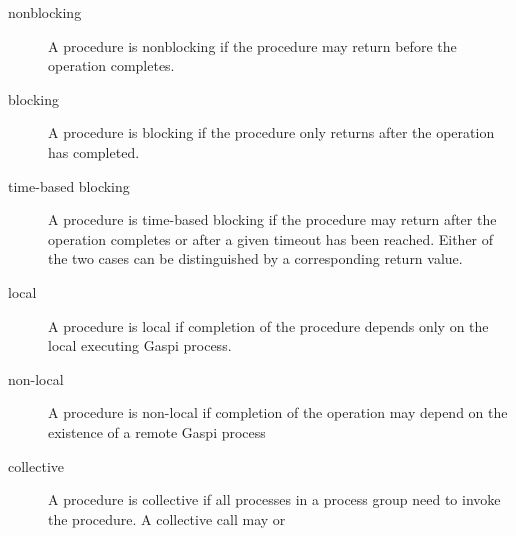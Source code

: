 \documentclass{article}
\newlength{\st}\setlength{\st}{0pt}
\newcommand{\GASPI}{{\sc Gaspi}}
\begin{document}
\begin{description}
\item[nonblocking] A procedure is nonblocking if the procedure may
  return before the operation completes.
\begin{center}
\end{center}
\item[blocking] A procedure is blocking if the procedure only returns
  after the operation has completed.
\begin{center}
\end{center}
\item[time-based blocking] A procedure is time-based blocking if the
  procedure may return after the operation completes or after a given
  timeout has been reached. Either of the two cases can be
  distinguished by a corresponding return value.
\begin{center}
\end{center}
\item[local] A procedure is local if completion of the procedure depends
  only on the local executing \GASPI{} process.
\item[non-local] A procedure is non-local if completion of the
  operation may depend on the existence of a remote \GASPI{} process
\item[collective] A procedure is collective if all processes in a
  process group need to invoke the procedure. A collective call may or

\end{description}
\end{document}
